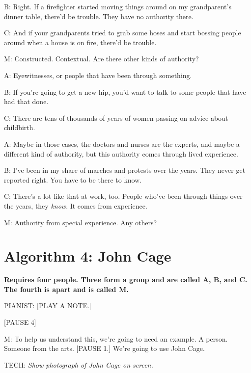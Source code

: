 \documentclass[17pt]{extarticle}
\begin{document}
B:  Right.  If a firefighter started moving things around on my grandparent's dinner table, there'd be trouble.  They have no authority there.

C:  And if your grandparents tried to grab some hoses and start bossing people around when a house is on fire, there'd be trouble.

M:  Constructed.  Contextual.  Are there other kinds of authority?

A:  Eyewitnesses, or people that have been through something.

B:  If you're going to get a new hip, you'd want to talk to some people that have had that done.

C:  There are tens of thousands of years of women passing on advice about childbirth.

A:  Maybe in those cases, the doctors and nurses are the experts, and maybe a different kind of authority, but this authority comes through lived experience.

B:  I've been in my share of marches and protests over the years.  They never get reported right.  You have to be there to know.

C:  There's a lot like that at work, too.  People who've been through things over the years, they \textit{know}.  It comes from experience.

M:  Authority from special experience.  Any others?
















\newpage

\section*{Algorithm 4: John Cage}

\textbf{Requires four people.  Three form a group and are called A, B, and C.  The fourth is apart and is called M.}

PIANIST:  [PLAY A NOTE.]

[PAUSE 4]

M:  To help us understand this, we're going to need an example.  A person.  Someone from the arts. [PAUSE 1.]  We're going to use John Cage.

TECH:  \textit{Show photograph of John Cage on screen.}
\end{document}
